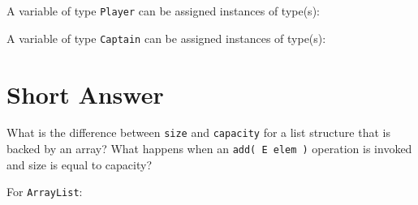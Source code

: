 \documentclass[11pt]{exam}
\begin{document}
\begin{questions}
\question[2] A variable of type {\tt Player} can be assigned instances of type(s):
 
\question[2] A variable of type {\tt Captain} can be assigned instances of type(s):

\newpage


\section*{Short Answer}

\question[4] What is the difference between {\tt size} and {\tt capacity} for a list structure that is backed by an array?  What happens when an {\tt add( E elem )} operation is invoked and size is equal to capacity?
\vspace{1.5in}

\question For {\tt ArrayList}:
\end{questions}
\end{document}
